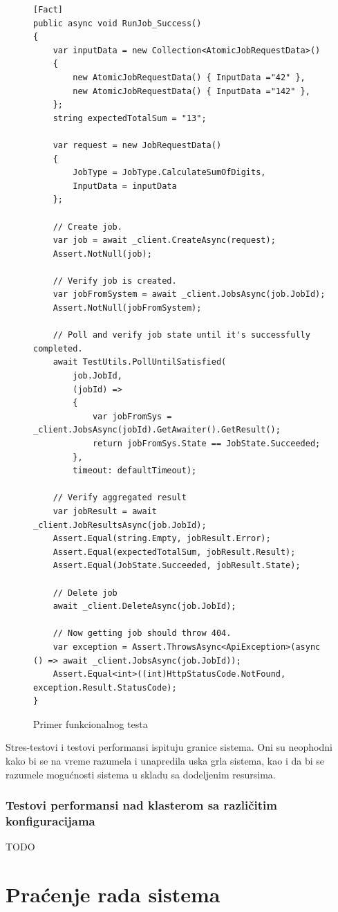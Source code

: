 \documentclass[12pt,oneside]{memoir}
\begin{document}
\begin{figure}[h!]
\centering
\begin{lstlisting}
[Fact]
public async void RunJob_Success()
{
	var inputData = new Collection<AtomicJobRequestData>()
	{
		new AtomicJobRequestData() { InputData ="42" },
		new AtomicJobRequestData() { InputData ="142" },
	};
	string expectedTotalSum = "13";

	var request = new JobRequestData()
	{
		JobType = JobType.CalculateSumOfDigits,
		InputData = inputData
	};

	// Create job.
	var job = await _client.CreateAsync(request);
	Assert.NotNull(job);

	// Verify job is created.
	var jobFromSystem = await _client.JobsAsync(job.JobId);
	Assert.NotNull(jobFromSystem);

	// Poll and verify job state until it's successfully completed.
	await TestUtils.PollUntilSatisfied(
		job.JobId,
		(jobId) =>
		{
			var jobFromSys = _client.JobsAsync(jobId).GetAwaiter().GetResult();
			return jobFromSys.State == JobState.Succeeded;
		},
		timeout: defaultTimeout);

	// Verify aggregated result
	var jobResult = await _client.JobResultsAsync(job.JobId);
	Assert.Equal(string.Empty, jobResult.Error);
	Assert.Equal(expectedTotalSum, jobResult.Result);
	Assert.Equal(JobState.Succeeded, jobResult.State);

	// Delete job
	await _client.DeleteAsync(job.JobId);

	// Now getting job should throw 404.
	var exception = Assert.ThrowsAsync<ApiException>(async () => await _client.JobsAsync(job.JobId));
	Assert.Equal<int>((int)HttpStatusCode.NotFound, exception.Result.StatusCode);
}
\end{lstlisting}
\caption{Primer funkcionalnog testa}
\label{fig:teste2e}
\end{figure}

Stres-testovi i testovi performansi ispituju granice sistema. Oni su neophodni kako bi se na vreme razumela i unapredila uska grla sistema, kao i da bi se razumele mogućnosti sistema u skladu sa dodeljenim resursima.

\subsubsection{Testovi performansi nad klasterom sa različitim konfiguracijama}
TODO


\section{Praćenje rada sistema}
\label{chp:pracenjemetrika}
\end{document}
